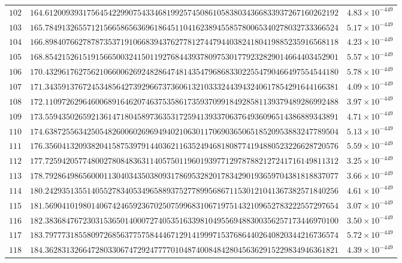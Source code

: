 \documentclass[12pt,reqno]{amsart}
\theoremstyle{plain}
\theoremstyle{definition}
\theoremstyle{remark}
\begin{document}
\begin{longtable}{clc}
$102$ & $164.6120093931756454229907543346819925745086105838034366833937267160262192$ & $4.83 \times 10^{-449}$ \\
$103$ & $165.7849132655712156658656369618645110416238945585780065340278032733366524$ & $5.17 \times 10^{-449}$ \\
$104$ & $166.8984076627878735371910668394376277812744794403824180419885235916568118$ & $4.23 \times 10^{-449}$ \\
$105$ & $168.8542152615191566500324150119276844393780975301779232829014664403452901$ & $5.57 \times 10^{-449}$ \\
$106$ & $170.4329617627562106600626924828647481435479686833022554790466497554544180$ & $5.78 \times 10^{-449}$ \\
$107$ & $171.3435913767245348564273929667373606132103332443943240617854291644166381$ & $4.09 \times 10^{-449}$ \\
$108$ & $172.1109726296460068916462074637535861735937099184928581139379489286992488$ & $3.97 \times 10^{-449}$ \\
$109$ & $173.5594350265921361471804589736353172594139337063764936096514386889343891$ & $4.71 \times 10^{-449}$ \\
$110$ & $174.6387255634250548260060269694940210630117069036506518520953883247789504$ & $5.13 \times 10^{-449}$ \\
$111$ & $176.3560413209382041587539791440362116352494681808774194880523226628720576$ & $5.59 \times 10^{-449}$ \\
$112$ & $177.7259420577480027808483631140575011960193977129787882127241716149811312$ & $3.25 \times 10^{-449}$ \\
$113$ & $178.7928649865600011304034350380931786953282017834290193659704381818837077$ & $3.66 \times 10^{-449}$ \\
$114$ & $180.2429351355140552783405349658893752778995686711530121041367382571840256$ & $4.61 \times 10^{-449}$ \\
$115$ & $181.5690410198014067424659236702507599683106719751432109652783222557297654$ & $3.07 \times 10^{-449}$ \\
$116$ & $182.3836847672303153650140007274053516339810495569488300356257173446970100$ & $3.50 \times 10^{-449}$ \\
$117$ & $183.7977731855809726856377575844467129141999715376864402640820344216736574$ & $5.72 \times 10^{-449}$ \\
$118$ & $184.3628313266472803306747292477770104874008484280456362915229834946361821$ & $4.39 \times 10^{-449}$ \\

\end{longtable}
\end{document}
